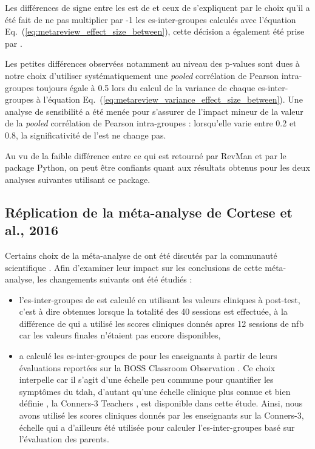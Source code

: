 Les différences de signe entre les \gls{est} de \citet{Cortese2016} et ceux de \citet{Bussalb2019clinical} s'expliquent par le choix qu'il a été fait de ne pas multiplier
par -1 les \gls{es}-inter-groupes calculés avec l'équation Eq.~(\ref{eq:metareview_effect_size_between}), cette décision a également été prise par 
\citet{Micoulaud2014}.

Les petites différences observées notamment au niveau des p-values sont dues à notre choix d'utiliser systématiquement une \textit{pooled} corrélation de Pearson 
intra-groupes toujours égale à 0.5 \citep{Balk2012} lors du calcul de la variance de chaque \gls{es}-inter-groupes à l'équation 
Eq.~(\ref{eq:metareview_variance_effect_size_between}). Une analyse de sensibilité a été menée pour s'assurer de l'impact mineur de la valeur de la \textit{pooled} 
corrélation de Pearson intra-groupes : lorsqu'elle varie entre 0.2 et 0.8, la significativité de l'\gls{est} ne change pas.

Au vu de la faible différence entre ce qui est retourné par RevMan et par le package Python, on peut être confiants quant aux résultats obtenus pour les 
deux analyses suivantes utilisant ce package. 

\subsection{Réplication de la méta-analyse de Cortese et al., 2016} \label{replication}

Certains choix de la méta-analyse de \citet{Cortese2016} ont été discutés par la communauté scientifique \citep{Micoulaud2016}. Afin d'examiner leur impact sur 
les conclusions de cette méta-analyse, les changements suivants ont été étudiés :

\begin{itemize}
\item l'\gls{es}-inter-groupes de \citet{Arnold2014} est calculé en utilisant les valeurs cliniques à post-test, c'est à dire obtenues lorsque la totalité 
des 40 sessions est effectuée, à la différence de \citet{Cortese2016} qui a utilisé les scores cliniques donnés apres 12 sessions de \gls{nfb} car les valeurs 
finales n'étaient pas encore disponibles,
\item \citet{Cortese2016} a calculé les \gls{es}-inter-groupes de \citet{Steiner2014} pour les enseignants à partir de leurs évaluations reportées sur 
la BOSS Classroom Observation \citep{Shapiro2010}. Ce choix interpelle car il s'agit d'une échelle peu commune pour quantifier les symptômes du \gls{tdah}, d'autant qu'une échelle clinique 
plus connue et bien définie \citep{Collett2003, Epstein2012, Bluschke2016}, la Conners-3 Teachers \citep{Conners1998, Conners2008}, est disponible dans 
cette étude. Ainsi, nous avons utilisé les scores cliniques donnés par les enseignants sur la Conners-3, échelle 
qui a d'ailleurs été utilisée pour calculer l'\gls{es}-inter-groupes basé sur l'évaluation des parents. 
\end{itemize}

